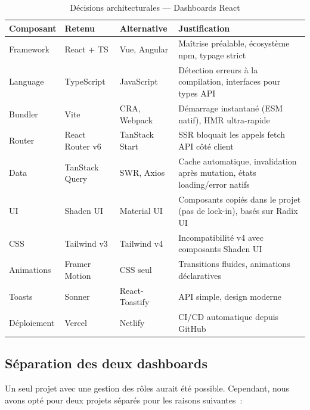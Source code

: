 \begin{table}[H]
  \centering
  \begin{tabularx}{\textwidth}{lllX}
    \toprule
    \textbf{Composant} & \textbf{Retenu} & \textbf{Alternative} & \textbf{Justification} \\
    \midrule
    Framework  & React + TS  & Vue, Angular   & Maîtrise préalable, écosystème npm,
                                                typage strict \\
    Language   & TypeScript  & JavaScript     & Détection erreurs à la compilation,
                                                interfaces pour types API \\
    Bundler    & Vite        & CRA, Webpack   & Démarrage instantané (ESM natif),
                                                HMR ultra-rapide \\
    Router     & React Router v6 & TanStack Start & SSR bloquait les appels fetch API
                                                    côté client \\
    Data       & TanStack Query & SWR, Axios  & Cache automatique, invalidation après
                                                mutation, états loading/error natifs \\
    UI         & Shadcn UI   & Material UI    & Composants copiés dans le projet
                                                (pas de lock-in), basés sur Radix UI \\
    CSS        & Tailwind v3 & Tailwind v4    & Incompatibilité v4 avec composants
                                                Shadcn UI \\
    Animations & Framer Motion & CSS seul    & Transitions fluides, animations déclaratives \\
    Toasts     & Sonner      & React-Toastify & API simple, design moderne \\
    Déploiement & Vercel     & Netlify        & CI/CD automatique depuis GitHub \\
    \bottomrule
  \end{tabularx}
  \caption{Décisions architecturales --- Dashboards React}
  \label{tab:archi_frontend}
\end{table}

\subsection{Séparation des deux dashboards}

Un seul projet avec une gestion des rôles aurait été possible. Cependant, nous avons
opté pour deux projets séparés pour les raisons suivantes~:

